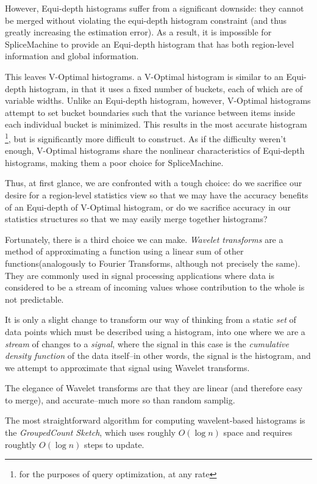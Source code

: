 However, Equi-depth histograms suffer from a significant downside: they cannot be merged without violating the equi-depth histogram constraint (and thus greatly increasing the estimation error). As a result, it is impossible for SpliceMachine to provide an Equi-depth histogram that has both region-level information and global information.

This leaves V-Optimal histograms. a V-Optimal histogram is similar to an Equi-depth histogram, in that it uses a fixed number of buckets, each of which are of variable widths. Unlike an Equi-depth histogram, however, V-Optimal histograms attempt to set bucket boundaries such that the variance between items inside each individual bucket is minimized. This results in the most accurate histogram \footnote{for the purposes of query optimization, at any rate}, but is significantly more difficult to construct. As if the difficulty weren't enough, V-Optimal histograms share the nonlinear characteristics of Equi-depth histograms, making them a poor choice for SpliceMachine.

Thus, at first glance, we are confronted with a tough choice: do we sacrifice our desire for a region-level statistics view so that we may have the accuracy benefits of an Equi-depth of V-Optimal histogram, or do we sacrifice accuracy in our statistics structures so that we may easily merge together histograms?

Fortunately, there is a third choice we can make. \emph{Wavelet transforms} are a method of approximating a function using a linear sum of other functions(analogously to Fourier Transforms, although not precisely the same). They are commonly used in signal processing applications where data is considered to be a stream of incoming values whose contribution to the whole is not predictable.

It is only a slight change to transform our way of thinking from a static \emph{set} of data points which must be described using a histogram, into one where we are a \emph{stream} of changes to a \emph{signal}, where the signal in this case is the \emph{cumulative density function} of the data itself--in other words, the signal is the histogram, and we attempt to approximate that signal using Wavelet transforms.

The elegance of Wavelet transforms are that they are linear (and therefore easy to merge\cite{GilbertWaveletHistograms}), and accurate--much more so than random samplig\cite{MatiasWaveletHistogram}. 

The most straightforward algorithm for computing wavelent-based histograms is the \emph{GroupedCount Sketch}\cite{CormodeGroupedCountSketch}, which uses roughly $O(\log{n})$ space and requires roughtly $O(\log{n})$ steps to update.

